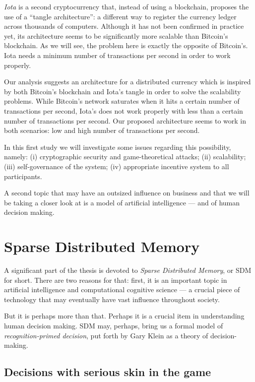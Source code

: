 \emph{Iota} is a second cryptocurrency that, instead of using a blockchain, proposes the use of a ``tangle architecture'': a different way to register the currency ledger across thousands of computers. Although it has not been confirmed in practice yet, its architecture seems to be significantly more scalable than Bitcoin's blockchain. As we will see, the problem here is exactly the opposite of Bitcoin's. Iota needs a minimum number of transactions per second in order to work properly.

Our analysis suggests an architecture for a distributed currency which is inspired by both Bitcoin's blockchain and Iota's tangle in order to solve the scalability problems. While Bitcoin's network saturates when it hits a certain number of transactions per second, Iota's does not work properly with less than a certain number of transactions per second. Our proposed architecture seems to work in both scenarios: low and high number of transactions per second.

In this first study we will investigate some issues regarding this possibility, namely: (i) cryptographic security and game-theoretical attacks; (ii) scalability; (iii) self-governance of the system; (iv) appropriate incentive system to all participants.

A second topic that may have an outsized influence on business and that we will be taking a closer look at is a model of artificial intelligence --- and of human decision making.

\section{Sparse Distributed Memory}

A significant part of the thesis is devoted to \emph{Sparse Distributed Memory}, or SDM for short.  There are two reasons for that: first, it is an important topic in artificial intelligence and computational cognitive science --- a crucial piece of technology that may eventually have vast influence throughout society.

But it is perhaps more than that.  Perhaps it is a crucial item in understanding human decision making.  SDM may, perhaps, bring us a formal model of \emph{recognition-primed decision}, put forth by Gary Klein as a theory of decision-making.

\subsection{Decisions with serious skin in the game}

